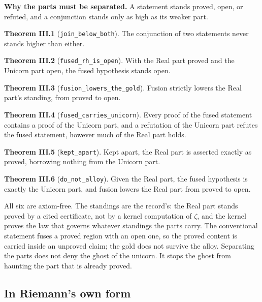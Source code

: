 \documentclass[10pt,twocolumn]{article}
\begin{document}
\textbf{Why the parts must be separated.} A statement stands proved,
open, or refuted, and a conjunction stands only as high as its weaker
part.

\textbf{Theorem III.1} (\texttt{join\_below\_both}). The conjunction of
two statements never stands higher than either.

\textbf{Theorem III.2} (\texttt{fused\_rh\_is\_open}). With the Real
part proved and the Unicorn part open, the fused hypothesis stands open.

\textbf{Theorem III.3} (\texttt{fusion\_lowers\_the\_gold}). Fusion
strictly lowers the Real part's standing, from proved to open.

\textbf{Theorem III.4} (\texttt{fused\_carries\_unicorn}). Every proof
of the fused statement contains a proof of the Unicorn part, and a
refutation of the Unicorn part refutes the fused statement, however much
of the Real part holds.

\textbf{Theorem III.5} (\texttt{kept\_apart}). Kept apart, the Real part
is asserted exactly as proved, borrowing nothing from the Unicorn part.

\textbf{Theorem III.6} (\texttt{do\_not\_alloy}). Given the Real part,
the fused hypothesis is exactly the Unicorn part, and fusion lowers the
Real part from proved to open.

All six are axiom-free. The standings are the record's: the Real part
stands proved by a cited certificate, not by a kernel computation of
\(\zeta\), and the kernel proves the law that governs whatever standings
the parts carry. The conventional statement fuses a proved region with
an open one, so the proved content is carried inside an unproved claim;
the gold does not survive the alloy. Separating the parts does not deny
the ghost of the unicorn. It stops the ghost from haunting the part that
is already proved.

\hypertarget{in-riemanns-own-form}{%
\subsection{In Riemann's own form}\label{in-riemanns-own-form}}
\end{document}
